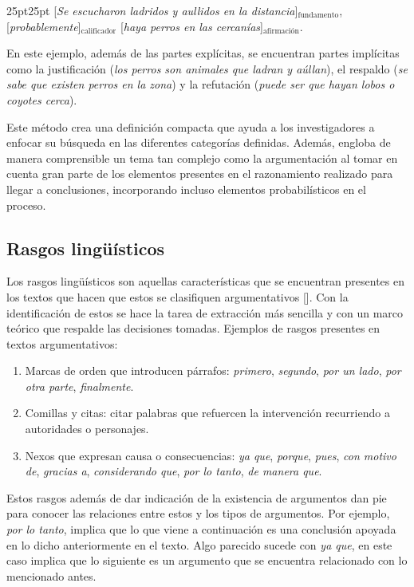 \begin{adjustwidth}{25pt}{25pt}
    [\emph{Se escucharon ladridos y aullidos en la distancia}]$_{\mathrm{fundamento}}$, 
    [\emph{probablemente}]$_{\mathrm{calificador}}$ 
    [\emph{haya perros en las cercanías}]$_{\mathrm{afirmación}}$.
\end{adjustwidth}

En este ejemplo, además de las partes explícitas, se encuentran partes implícitas como la justificación 
(\emph{los perros son animales que ladran y aúllan}), el respaldo (\emph{se sabe que existen perros en la zona}) y 
la refutación (\emph{puede ser que hayan lobos o coyotes cerca}).

Este método crea una definición compacta que ayuda a los investigadores a enfocar su búsqueda 
en las diferentes categorías definidas. Además, engloba de manera comprensible un tema tan complejo 
como la argumentación al tomar en cuenta gran parte de los elementos presentes en el razonamiento
realizado para llegar a conclusiones, incorporando incluso elementos probabilísticos en el proceso. 

\subsection{Rasgos lingüísticos}

Los rasgos lingüísticos son aquellas características que se encuentran presentes en los textos 
que hacen que estos se clasifiquen argumentativos [\cite{venegas2005hacia}]. Con 
la identificación de estos se hace la tarea de extracción más sencilla y con un marco teórico 
que respalde las decisiones tomadas. Ejemplos de rasgos presentes en textos argumentativos:

\begin{enumerate}
    \item Marcas de orden que introducen párrafos: \emph{primero}, \emph{segundo}, \emph{por un lado}, 
    \emph{por otra parte}, \emph{finalmente}.
    \item Comillas y citas: citar palabras que refuercen la intervención recurriendo a autoridades
    o personajes.
    \item Nexos que expresan causa o consecuencias: \emph{ya que}, \emph{porque}, \emph{pues}, 
    \emph{con motivo de}, \emph{gracias a}, \emph{considerando que}, \emph{por lo tanto}, \emph{de manera que}.
\end{enumerate}

Estos rasgos además de dar indicación de la existencia de argumentos dan pie para conocer las relaciones
entre estos y los tipos de argumentos. Por ejemplo, \emph{por lo tanto}, implica que lo que viene 
a continuación es una conclusión apoyada en lo dicho anteriormente en el texto. Algo parecido
sucede con \emph{ya que}, en este caso implica que lo siguiente es un argumento que se encuentra 
relacionado con lo mencionado antes.

